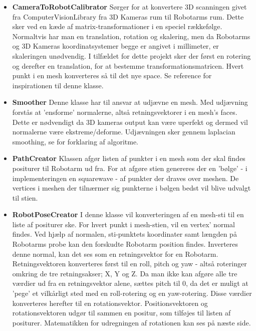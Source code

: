 \begin{itemize}
\item{\textbf{CameraToRobotCalibrator}} \newline
Sørger for at konvertere 3D scanningen givet fra ComputerVisionLibrary fra 3D Kameras rum til Robotarms rum.
Dette sker ved en kæde af matrix-transformationer i en speciel rækkefølge. 
Normaltvis har man en translation, rotation og skalering, men da Robotarms og 3D Kameras koordinatsystemer begge er angivet i millimeter, er skaleringen unødvendig.
I tilfældet for dette projekt sker der først en rotering og derefter en translation, for at bestemme transformationsmatricen. 
Hvert punkt i en mesh konverteres så til det nye space. Se reference \cite{RumTransformation} for inspirationen til denne klasse.

\item{\textbf{Smoother}}\newline
Denne klasse har til ansvar at udjævne en mesh. Med udjævning forstås at 'ensforme' normalerne, altså retningsvektorer i en mesh's faces.
Dette er nødvendigt da 3D kameras output kan være uperfekt og dermed vil normalerne være ekstreme/deforme. Udjævningen sker gennem laplacian smoothing, se \cite{Smooth} for forklaring af algoritme.

\item{\textbf{PathCreator}}\newline
Klassen afgør listen af punkter i en mesh som der skal findes positurer til Robotarm ud fra.
For at afgøre stien genereres der en 'bølge' - i implementeringen en squarewave - af punkter der draves over meshen.
De vertices i meshen der tilnærmer sig punkterne i bølgen bedst vil blive udvalgt til stien.

\item{\textbf{RobotPoseCreator}}\newline
I denne klasse vil konverteringen af en mesh-sti til en liste af positurer ske.
For hvert punkt i mesh-stien, vil en vertex' normal findes. 
Ved hjælp af normalen, sti-punktets koordinater samt længden på Robotarms probe kan den forskudte Robotarm position findes.
Inverteres denne normal, kan det ses som en retningsvektor for en Robotarm.
Retningsvektoren konverteres først til en roll, pitch og yaw - altså roteringer omkring de tre retningsakser; X, Y og Z.
Da man ikke kan afgøre alle tre værdier ud fra en retningsvektor alene, sættes pitch til 0, da det er muligt at 'pege' et vilkårligt sted med en roll-rotering og en yaw-rotering. Disse værdier konverteres herefter til en rotationsvektor.
Positionsvektoren og rotationsvektoren udgør til sammen en positur, som tilføjes til listen af positurer. Matematikken for udregningen af rotationen kan ses på næste side.
\newpage


\end{itemize}
